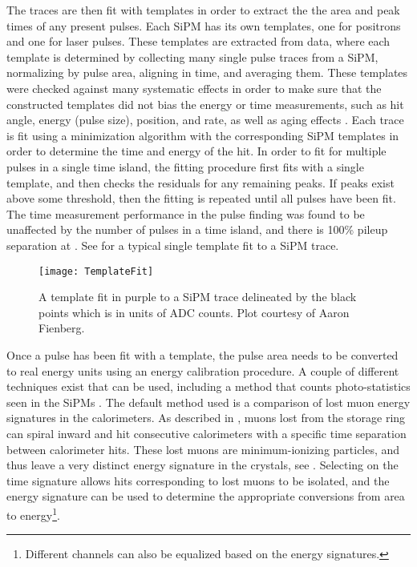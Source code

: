The traces are then fit with templates in order to extract the the area and peak times of any present pulses. Each SiPM has its own templates, one for positrons and one for laser pulses. These templates are extracted from data, where each template is determined by collecting many single pulse traces from a SiPM, normalizing by pulse area, aligning in time, and averaging them. These templates were checked against many systematic effects in order to make sure that the constructed templates did not bias the energy or time measurements, such as hit angle, energy (pulse size), position, and rate, as well as aging effects \cite{Kaspar:2016ofv,AFThesis}. Each trace is fit using a \chisq minimization algorithm with the corresponding SiPM templates in order to determine the time and energy of the hit. In order to fit for multiple pulses in a single time island, the fitting procedure first fits with a single template, and then checks the residuals for any remaining peaks. If peaks exist above some threshold, then the fitting is repeated until all pulses have been fit. The time measurement performance in the pulse finding was found to be unaffected by the number of pulses in a time island, and there is 100\% pileup separation at  \cite{AFThesis}. See  for a typical single template fit to a SiPM trace.


\begin{figure}[]
    \centering
    \texttt{[image: TemplateFit]}
    \caption[Template fit to SiPM trace]{A template fit in purple to a SiPM trace delineated by the black points which is in units of ADC counts. Plot courtesy of Aaron Fienberg.}
    \label{fig:TemplateFit}
\end{figure}


Once a pulse has been fit with a template, the pulse area needs to be converted to real energy units using an energy calibration procedure. A couple of different techniques exist that can be used, including a method that counts photo-statistics seen in the SiPMs \cite{AFThesis}. The default method used is a comparison of lost muon energy signatures in the calorimeters. As described in , muons lost from the storage ring can spiral inward and hit consecutive calorimeters with a specific time separation between calorimeter hits. These lost muons are minimum-ionizing particles, and thus leave a very distinct energy signature in the crystals, see . Selecting on the time signature allows hits corresponding to lost muons to be isolated, and the energy signature can be used to determine the appropriate conversions from area to energy\footnote{Different channels can also be equalized based on the energy signatures.}. 


